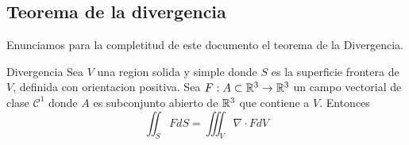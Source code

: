 \message{ !name(MAT024.tex)}\documentclass[../main.tex]{subfiles}
\begin{document}
\subsection{Teorema de la divergencia}
Enunciamos para la completitud de este documento el teorema de la Divergencia.
\begin{teorema}Divergencia
  Sea $V$ una region solida y simple donde $S$ es la superficie frontera de $V$, definida con orientacion positiva. Sea $F: A \subset \mathbb{R}^{3} \to \mathbb{R}^{3}$ un campo vectorial de clase $\mathcal{C}^{1}$ donde $A$ es subconjunto abierto de $\mathbb{R}^{3}$ que contiene a $V$. Entonces
  \begin{equation*}
    \iint_{S} F dS = \iiint_{V} \nabla \cdot F dV
  \end{equation*}
\end{teorema}
\end{document}
